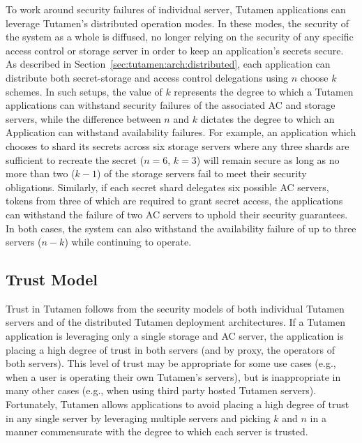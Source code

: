 To work around security failures of individual server, Tutamen
applications can leverage Tutamen's distributed operation modes. In
these modes, the security of the system as a whole is diffused, no
longer relying on the security of any specific access control or
storage server in order to keep an application's secrets secure. As
described in Section~\ref{sec:tutamen:arch:distributed}, each
application can distribute both secret-storage and access control
delegations using $n$ choose $k$ schemes. In such setups, the value of
$k$ represents the degree to which a Tutamen applications can
withstand security failures of the associated AC and storage servers,
while the difference between $n$ and $k$ dictates the degree to which
an Application can withstand availability failures. For example, an
application which chooses to shard its secrets across six storage
servers where any three shards are sufficient to recreate the secret
($n=6$, $k=3$) will remain secure as long as no more than two ($k-1$)
of the storage servers fail to meet their security
obligations. Similarly, if each secret shard delegates six possible AC
servers, tokens from three of which are required to grant secret
access, the applications can withstand the failure of two AC servers
to uphold their security guarantees. In both cases, the system can
also withstand the availability failure of up to three servers ($n-k$)
while continuing to operate.

\subsection{Trust Model}

Trust in Tutamen follows from the security models of both individual
Tutamen servers and of the distributed Tutamen deployment
architectures. If a Tutamen application is leveraging only a single
storage and AC server, the application is placing a high degree of
trust in both servers (and by proxy, the operators of both
servers). This level of trust may be appropriate for some use cases
(e.g., when a user is operating their own Tutamen's servers), but is
inappropriate in many other cases (e.g., when using third party hosted
Tutamen servers). Fortunately, Tutamen allows applications to avoid
placing a high degree of trust in any single server by leveraging
multiple servers and picking $k$ and $n$ in a manner commensurate with
the degree to which each server is trusted.

